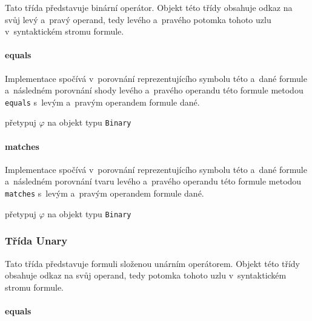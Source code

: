 \documentclass[thesis=B,czech,hidelinks]{thesis}[2012/06/26]
\begin{document}
Tato třída představuje binární operátor. Objekt této třídy obsahuje odkaz na svůj levý a~pravý operand, tedy levého a~pravého potomka tohoto uzlu v~syntaktickém stromu formule.

\paragraph{equals}

Implementace spočívá v~porovnání reprezentujícího symbolu této a~dané formule a~následném porovnání shody levého a~pravého operandu této formule metodou \texttt{equals} s~levým a~pravým operandem formule dané.

\begin{algorithm}
{
	přetypuj $\varphi$ na objekt typu \texttt{Binary}\;
	\;
}
\end{algorithm}

\paragraph{matches}

Implementace spočívá v~porovnání reprezentujícího symbolu této a~dané formule a~následném porovnání tvaru levého a~pravého operandu této formule metodou \texttt{matches} s~levým a~pravým operandem formule dané.

\begin{algorithm}
{
	přetypuj $\varphi$ na objekt typu \texttt{Binary}\;
	\;
}
\end{algorithm}

\subsubsection{Třída Unary}

Tato třída představuje formuli složenou unárním operátorem. Objekt této třídy obsahuje odkaz na svůj operand, tedy potomka tohoto uzlu v~syntaktickém stromu formule.

\paragraph{equals}
\end{document}

